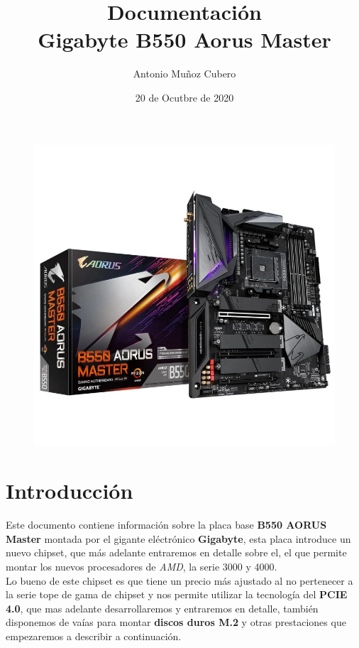 \documentclass{article}
\title{Documentación \\\large \textbf{Gigabyte B550 Aorus Master}}
\author{Antonio Muñoz Cubero}
\date{20 de Ocutbre de 2020}
\begin{document}
\maketitle
{}

\begin{figure}[h]
  \centering
  \includegraphics[scale = 0.5]{img/portada.png}
\end{figure}

\pagestyle{fancy} 

\newpage
\tableofcontents


\section{Introducción}
Este documento contiene información sobre la placa base \textbf{B550 AORUS Master} montada por el gigante eléctrónico \textbf{Gigabyte}, esta placa introduce un nuevo chipset, que más adelante entraremos en detalle sobre el, 
el  
que permite montar los nuevos procesadores de \textit{AMD}, la serie 3000 y 4000.\\
Lo bueno de este chipset es que tiene un precio más ajustado al no pertenecer a la serie tope de gama de chipset y nos permite utilizar la tecnología del \textbf{PCIE 4.0}, que mas adelante desarrollaremos y entraremos en 
detalle, también 
disponemos de vaías para montar \textbf{discos duros M.2} y otras prestaciones que empezaremos a describir a continuación.
\end{document}
